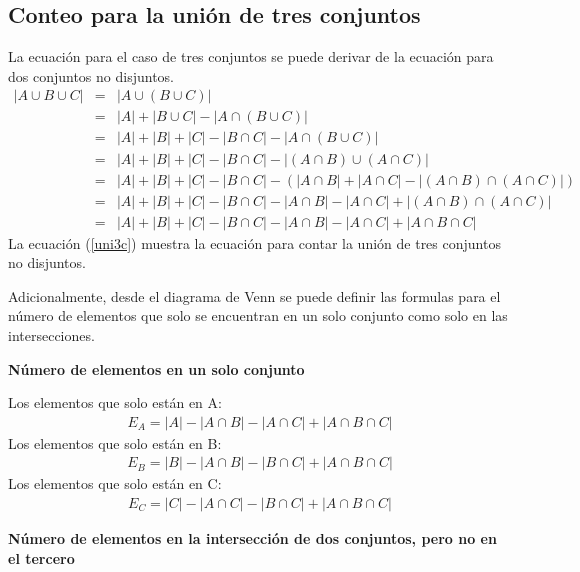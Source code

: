 \subsection{Conteo para la unión de tres conjuntos}
La ecuación para el caso de tres conjuntos se puede derivar de la ecuación para dos conjuntos no disjuntos.
\begin{eqnarray}
|A\cup B\cup C|&=&|A\cup (B\cup C)|\nonumber\\
&=&|A|+|B\cup C|-|A\cap (B\cup C)| \nonumber\\
&=&|A|+|B|+|C|-|B\cap C|-|A\cap (B\cup C)|\nonumber\\
&=&|A|+|B|+|C|-|B\cap C|-|(A\cap B)\cup(A\cap C)|\nonumber\\
&=&|A|+|B|+|C|-|B\cap C|-(|A\cap B|+|A\cap C|-|(A\cap B)\cap(A\cap C)|)\nonumber\\
&=&|A|+|B|+|C|-|B\cap C|-|A\cap B|-|A\cap C|+|(A\cap B)\cap(A\cap C)|\nonumber\\
&=&|A|+|B|+|C|-|B\cap C|-|A\cap B|-|A\cap C|+|A\cap B\cap C|
\label{uni3c}
\end{eqnarray}
La ecuación (\ref{uni3c}) muestra la ecuación para contar la unión de tres conjuntos no disjuntos.

Adicionalmente, desde el diagrama de Venn se puede definir las formulas para el número de elementos que solo se encuentran en un solo conjunto como solo en las intersecciones.\\

\begin{center}
\textbf{Número de elementos en un solo conjunto}\\
\end{center}


\noindent Los elementos que solo están en A:
\begin{eqnarray}
E_{A}=|A|-|A\cap B|-|A\cap C|+|A\cap B\cap C|
\end{eqnarray}
\noindent Los elementos que solo están en B:
\begin{eqnarray}
E_{B}=|B|-|A\cap B|-|B\cap C|+|A\cap B\cap C|
\end{eqnarray}
\noindent Los elementos que solo están en C:
\begin{eqnarray}
E_{C}=|C|-|A\cap C|-|B\cap C|+|A\cap B\cap C|
\end{eqnarray}

\begin{center}
\textbf{Número de elementos en la intersección de dos conjuntos, pero no en el tercero}\\
\end{center}

